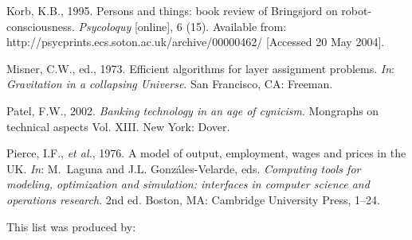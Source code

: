 \documentclass[]{cJEN2e}
\begin{document}
\begin{thebibliography}{9}
Korb, K.B., 1995. Persons and things: book review of Bringsjord on
  robot-consciousness. {\itshape Psycoloquy} [online], 6 (15). Available from: http://psycprints.ecs.soton.ac.uk/archive/00000462/ [Accessed 20 May 2004].

Misner, C.W., ed., 1973. Efficient algorithms for layer assignment problems. {\itshape{In}}:
  {\itshape Gravitation in a collapsing Universe}. San Francisco, CA:
  Freeman.

Patel, F.W., 2002. {\itshape Banking technology in an age of cynicism}. Mongraphs on
  technical aspects Vol. XIII. New York: Dover.

Pierce, I.F., {\itshape{et al.}}, 1976. A
  model of output, employment, wages and prices in the UK. {\itshape{In}}: M.~Laguna and
  J.L. Gonz\'{a}les-Velarde, eds. {\itshape Computing tools for modeling, optimization and simulation: interfaces in
  computer science and operations research}. 2nd  ed. Boston, MA: Cambridge University
  Press, 1--24.
\end{thebibliography}
\medskip
\noindent This list was produced by:
\medskip
\end{document}
